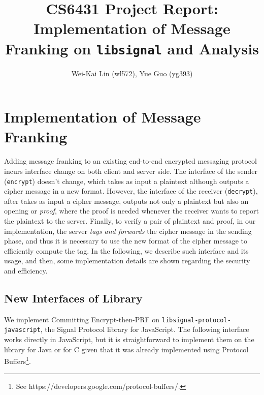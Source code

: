 \documentclass{article}
\title{CS6431 Project Report: Implementation of Message Franking on \texttt{libsignal} and Analysis}
\author{Wei-Kai Lin (wl572), Yue Guo (yg393)}
\newcommand{\weikai}[1]{\textcolor{blue}{[weikai: #1]}}
\begin{document}
\maketitle

    






\section{Implementation of Message Franking}

Adding message franking to an existing end-to-end encrypted
messaging protocol incurs interface change on both client and server side.
The interface of the sender ({\tt encrypt}) doesn't change,
which takes as input a plaintext
although outputs a cipher message in a new format.
However, the interface of the receiver ({\tt decrypt}),
after takes as input a cipher message,
outputs not only a plaintext but also an opening or \emph{proof},
where the proof is needed 
whenever the receiver wants to report the plaintext to the server.
Finally, to verify a pair of plaintext and proof,
in our implementation,
the server \emph{tags and forwards} the cipher message in the sending phase,
and thus it is necessary to use the new format of the cipher message
to efficiently compute the tag.
In the following, we describe such interface and its usage,
and then, some implementation details are shown 
regarding the security and efficiency.

\subsection{New Interfaces of Library}

We implement Committing Encrypt-then-PRF on {\tt libsignal-protocol-javascript},
the Signal Protocol library for JavaScript.
The following interface works directly in JavaScript,
but it is straightforward to 
implement them on the library for Java or for C
given that it was already implemented using Protocol Buffers\footnote{
See https://developers.google.com/protocol-buffers/.
}.
\end{document}
